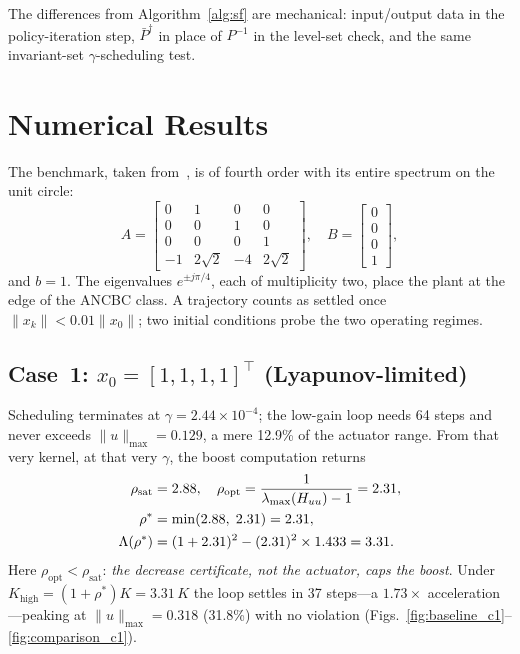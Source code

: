 \documentclass[final,5p,times,authoryear]{elsarticle}
\theoremstyle{plain}
\theoremstyle{definition}
\theoremstyle{remark}
\begin{document}
The differences from Algorithm~\ref{alg:sf} are mechanical:
input/output data in the policy-iteration step,
$\bar P^{\dagger}$ in place of $P^{-1}$ in the level-set check, and the
same invariant-set $\gamma$-scheduling test.


\section{Numerical Results}\label{sec:results}

The benchmark, taken from~\citep{RizviLin2018CDC,RizviLin2019IJRNC},
is of fourth order with its entire spectrum on the unit circle:
\begin{equation}
A = \begin{bmatrix}
       0 & 1 & 0 & 0 \\
       0 & 0 & 1 & 0 \\
       0 & 0 & 0 & 1 \\
      -1 & 2\sqrt{2} & -4 & 2\sqrt{2}
    \end{bmatrix},
\quad
B = \begin{bmatrix} 0 \\ 0 \\ 0 \\ 1 \end{bmatrix},
\label{eq:system_matrices}
\end{equation}
and $b = 1$.  The eigenvalues $e^{\pm j\pi/4}$, each of multiplicity
two, place the plant at the edge of the ANCBC class.  A trajectory
counts as settled once $\|x_k\| < 0.01\|x_0\|$; two initial conditions
probe the two operating regimes.

\subsection{Case~1: \texorpdfstring{$x_0 = [1,1,1,1]^\top$}{x0 = [1,1,1,1]} (Lyapunov-limited)}

Scheduling terminates at $\gamma = 2.44 \times 10^{-4}$; the low-gain
loop needs 64 steps and never exceeds $\|u\|_{\max} = 0.129$, a mere
12.9\% of the actuator range.  From that very kernel, at that very
$\gamma$, the boost computation returns
\begin{align}
\rho_{\mathrm{sat}} &= 2.88, \quad
\rho_{\mathrm{opt}} = \frac{1}{\lambda_{\max}(H_{uu})-1} = 2.31,
\notag \\
\rho^* &= \min(2.88,\; 2.31) = 2.31, \notag \\
\Lambda(\rho^*) &= (1+2.31)^2 - (2.31)^2 \times 1.433 = 3.31.
\end{align}
Here $\rho_{\mathrm{opt}} < \rho_{\mathrm{sat}}$: \emph{the decrease
certificate, not the actuator, caps the boost}.  Under
$K_{\mathrm{high}} = (1+\rho^{*})K = 3.31\,K$ the loop settles in 37
steps---a $1.73\times$ acceleration---peaking at
$\|u\|_{\max} = 0.318$ (31.8\%) with no violation
(Figs.~\ref{fig:baseline_c1}--\ref{fig:comparison_c1}).
\end{document}
